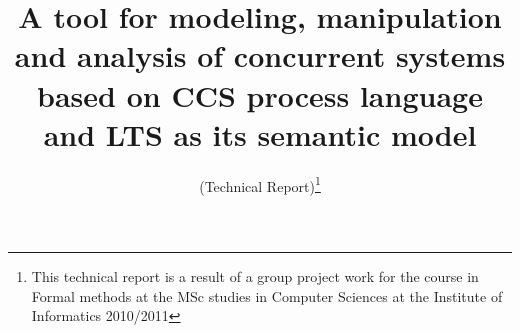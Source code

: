 \documentclass{llncs}
\begin{document}
\mainmatter

%
\pagestyle{plain}
\thispagestyle{plain}

\title{A tool for modeling, manipulation and analysis of concurrent systems based on CCS process language and LTS as its semantic model}
\subtitle{(Technical Report)\footnote{This technical report is a result of a group project work for the course in Formal methods at the MSc studies in Computer Sciences at the Institute of Informatics 2010/2011}}



\maketitle


% 
% 
% 
% 
 
 
 





\end{document}
